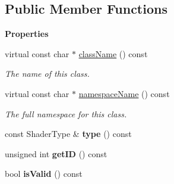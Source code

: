 \subsection*{Public Member Functions}
\begin{Indent}\textbf{ Properties}\par
\begin{DoxyCompactItemize}
\item 
\mbox{\label{classrev_1_1_shader_a8f2c067bfde4f711b2851a070c23c231}} 
virtual const char $\ast$ \mbox{\hyperlink{classrev_1_1_shader_a8f2c067bfde4f711b2851a070c23c231}{class\+Name}} () const
\begin{DoxyCompactList}\small\item\em The name of this class. \end{DoxyCompactList}\item 
\mbox{\label{classrev_1_1_shader_a38e06c7925f4626625efe972298988c1}} 
virtual const char $\ast$ \mbox{\hyperlink{classrev_1_1_shader_a38e06c7925f4626625efe972298988c1}{namespace\+Name}} () const
\begin{DoxyCompactList}\small\item\em The full namespace for this class. \end{DoxyCompactList}\item 
\mbox{\label{classrev_1_1_shader_a050d83c78761696f9787b07f016cde00}} 
const Shader\+Type \& {\bfseries type} () const
\item 
\mbox{\label{classrev_1_1_shader_a6e256a5a0fd87824e796c9631675d002}} 
unsigned int {\bfseries get\+ID} () const
\item 
\mbox{\label{classrev_1_1_shader_a455695ab630d13dcd03ceefd3abfbe19}} 
bool {\bfseries is\+Valid} () const
\end{DoxyCompactItemize}
\end{Indent}
